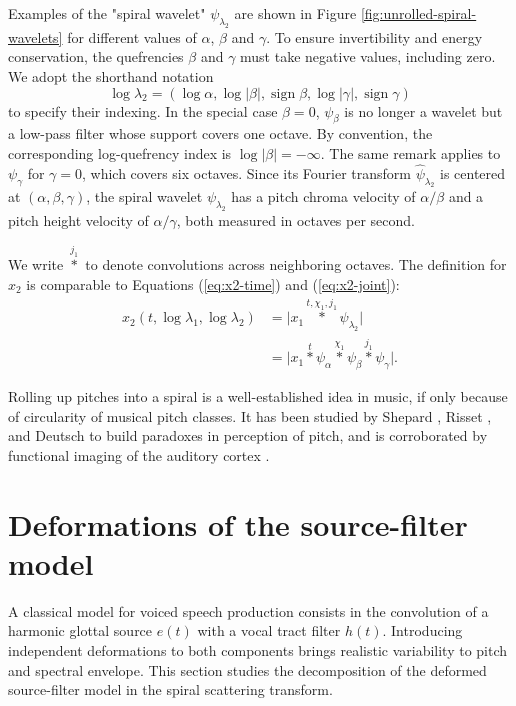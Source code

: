 \documentclass[twoside,a4paper]{article}
\DeclareMathOperator{\sign}{sign}
\begin{document}
Examples of the "spiral wavelet" $\psi_{\lambda_2}$ are shown in Figure \ref{fig:unrolled-spiral-wavelets} for different values of $\alpha$, $\beta$ and $\gamma$. To ensure invertibility and energy conservation, the quefrencies $\beta$ and $\gamma$ must take negative values, including zero. We adopt the shorthand notation
\begin{equation}
\log \lambda_2 =
\left( \log \alpha,
\log \vert \beta \vert, \sign \beta,
\log \vert \gamma \vert, \sign \gamma \right)
\end{equation}
to specify their indexing. In the special case $\beta = 0$, $\psi_\beta$ is no longer a wavelet but a low-pass filter whose support covers one octave. By convention, the corresponding log-quefrency index is $\log \vert \beta \vert = - \infty$. The same remark applies to $\psi_{\gamma}$ for $\gamma=0$, which covers six octaves. Since its Fourier transform $\widehat{\psi}_{\lambda_2}$  is centered at $(\alpha,\beta,\gamma)$, the spiral wavelet $\psi_{\lambda_2}$ has a pitch chroma velocity of $\alpha/\beta$ and a pitch height velocity of $\alpha/\gamma$, both measured in octaves per second.

We write $\overset{j_{1}}{\ast}$ to denote convolutions across neighboring octaves.
The definition for $x_2$ is comparable to Equations (\ref{eq:x2-time}) and (\ref{eq:x2-joint}):
\begin{equation}
\begin{split}
x_{2}(t,\log \lambda_{1},\log \lambda_{2})
& = \vert x_{1} \overset{t,\chi_{1},j_{1}}{\ast} \psi_{\lambda_{2}}\vert \\
&= \vert x_{1} \overset{t}{\ast} \psi_\alpha \overset{\chi_{1}}{\ast} \psi_\beta \overset{j_{1}}{\ast} \psi_\gamma \vert
.
\end{split}
\label{eq:x2-spiral}
\end{equation}

Rolling up pitches into a spiral is a well-established idea in music, if only because of circularity of musical pitch classes. It has been studied by Shepard \cite{Shepard1964}, Risset \cite{Risset1969}, and Deutsch \cite{Deutsch2008} to build paradoxes in perception of pitch, and is corroborated by functional imaging of the auditory cortex \cite{Warren2003}.




\section{Deformations of the source-filter model}
A classical model for voiced speech production consists in the convolution of a harmonic glottal source $e(t)$ with a vocal tract filter $h(t)$.
Introducing independent deformations to both components brings realistic variability to pitch and spectral envelope.
This section studies the decomposition of the deformed source-filter model in the spiral scattering transform.
\end{document}
